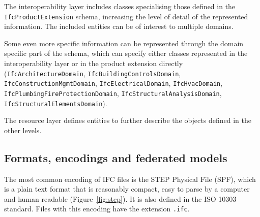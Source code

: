 The interoperability layer includes classes specialising those defined in the \texttt{IfcProductExtension} schema, increasing the level of detail of the represented information. The included entities can be of interest to multiple domains.

Some even more specific information can be represented through the domain specific part of the schema, which can specify either classes represented in the interoperability layer or in the product extension directly (\texttt{IfcArchitectureDomain}, \texttt{IfcBuildingControlsDomain}, \texttt{Ifc\-Cons\-truc\-tion\-Mgmt\-Do\-main}, \texttt{IfcElectricalDomain}, \texttt{IfcHvacDomain}, \texttt{Ifc\-Plum\-bing\-Fire\-Pro\-tec\-tion\-Do\-main}, \texttt{Ifc\-Struc\-tu\-ral\-A\-na\-ly\-sis\-Do\-main}, \texttt{Ifc\-Struc\-tu\-ral\-E\-le\-ments\-Do\-main}).

The resource layer defines entities to further describe the objects defined in the other levels.

\subsection{Formats, encodings and federated models}

The most common encoding of IFC files is the STEP Physical File (SPF), which is a plain text format that is reasonably compact, easy to parse by a computer and human readable (Figure~\ref{fig:step}).
It is also defined in the ISO 10303 standard.
Files with this encoding have the extension \texttt{.ifc}.

